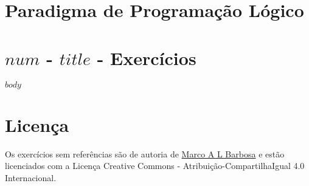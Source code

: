 \documentclass[a4paper,11pt]{article}
\begin{document}
\pagestyle{empty}

\section{Paradigma de Programação Lógico}

\section{$num$ - $title$ - Exercícios}

$body$

\section{Licença}

\begin{center}
Os exercícios sem referências são de autoria de \href{malbarbo.pro.br}{Marco A
L Barbosa} e estão licenciados com a Licença Creative Commons -
Atribuição-CompartilhaIgual 4.0 Internacional.

\href{http://cieativecommons.org/licenses/by-sa/4.0/}{\ccbysa}
\end{center}
\end{document}
